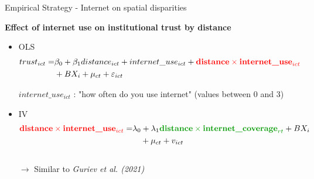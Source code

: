 \documentclass[10pt]{beamer}
\begin{document}
\begin{frame}{Empirical Strategy - Internet on spatial disparities}

\centering \textbf{Effect of internet use on institutional trust by distance}\vspace{1em}

\begin{itemize}
\item OLS
    \begin{equation}
\begin{split}
trust_{ict} = & \beta_{0} + \beta_{1} distance_{ict} + internet\_use_{ict} + \textcolor{red}{\textbf{distance} \times \textbf{internet\_use}_{ict}} \\
& + BX_{i} + \mu_{ct}+ \varepsilon_{ict}
\end{split}
\end{equation}\vspace{1em}

${internet\_use_{ict}}$ : "how often do you use internet" (values between 0 and 3)\vfill
\item IV
\begin{equation}
\begin{split}
    \textcolor{red}{\textbf{distance} \times \textbf{internet\_use}_{ict}} = & \lambda_{0} + 
    \lambda_{1} \textcolor[rgb]{0.0,0.6,0.0}{\textbf{distance} \times \textbf{internet\_coverage}_{rt}} + BX_{i} \\
    & \quad + \mu_{ct}+ v_{ict}
\end{split}
\end{equation}\\
   $\rightarrow$ Similar to \textit{Guriev et al. (2021)}
\end{itemize}
    
\end{frame}
    
\end{document}
